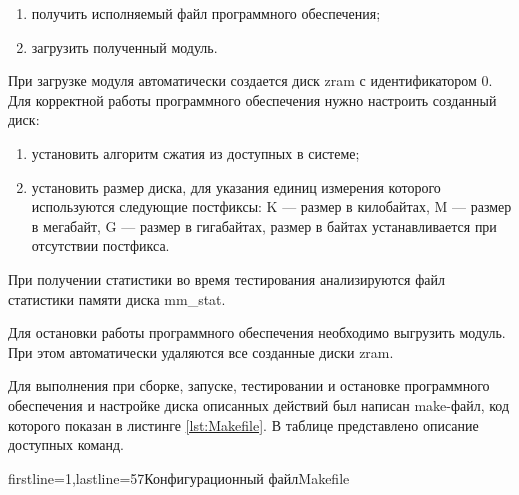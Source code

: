 \begin{enumerate}
    \item получить исполняемый файл программного обеспечения;
    \item загрузить полученный модуль.
\end{enumerate}

При загрузке модуля автоматически создается диск zram с идентификатором 0. Для корректной работы программного обеспечения нужно настроить созданный диск:

\begin{enumerate}
    \item установить алгоритм сжатия из доступных в системе;
    \item установить размер диска, для указания единиц измерения которого используются следующие постфиксы: K --- размер в килобайтах, M --- размер в мегабайт, G --- размер в гигабайтах, размер в байтах устанавливается при отсутствии постфикса.
\end{enumerate}

При получении статистики во время тестирования анализируются файл статистики памяти диска mm\_stat.

Для остановки работы программного обеспечения необходимо выгрузить модуль. При этом автоматически удаляются все созданные диски zram.

Для выполнения при сборке, запуске, тестировании и остановке программного обеспечения и настройке диска описанных действий был написан make-файл, код которого показан в листинге \ref{lst:Makefile}. В таблице представлено описание доступных команд.

    {firstline=1,lastline=57}{Конфигурационный файл}{Makefile}{}

